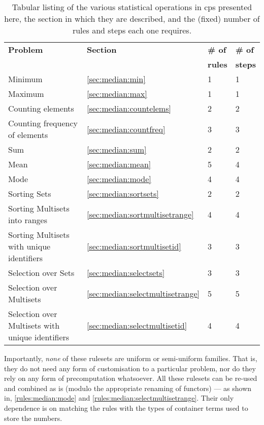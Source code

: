 \begin{table}[htbp] \centering
   \begin{tabular}{|l|l|l|l|}
    \hline
    \textbf{Problem} & \textbf{Section} & \textbf{\# of} & \textbf{\# of}\\&& \textbf{rules} & \textbf{steps}\\ \hline
    Minimum & \ref{sec:median:min} & 1 & 1 \\ %
    Maximum & \ref{sec:median:max} & 1 & 1 \\ \hline
    Counting elements & \ref{sec:median:countelems} & 2 & 2 \\ %
    Counting frequency of elements & \ref{sec:median:countfreq} & 3 & 3 \\ \hline
    Sum & \ref{sec:median:sum} & 2 & 2 \\ %
    Mean & \ref{sec:median:mean} & 5 & 4 \\ %
    Mode & \ref{sec:median:mode} & 4 & 4 \\ \hline
    Sorting Sets & \ref{sec:median:sortsets} & 2 & 2 \\ %
    Sorting Multisets into ranges & \ref{sec:median:sortmultisetrange} & 4 & 4 \\ %
    Sorting Multisets with unique identifiers & \ref{sec:median:sortmultisetid} & 3 & 3 \\ \hline
    Selection over Sets & \ref{sec:median:selectsets} & 3 & 3 \\ %
    Selection over Multisets & \ref{sec:median:selectmultisetrange} & 5 & 5 \\ %
    Selection over Multisets with unique identifiers & \ref{sec:median:selectmultisetid} & 4 & 4 \\ \hline
\end{tabular} 
\caption[Listing of various statistical operations in \gls{cps}]{\label{tab:median:summary}Tabular listing of the various statistical operations in \gls{cps} presented here, the section in which they are described, and the (fixed) number of rules and steps each one requires.}
\end{table}

Importantly, \emph{none} of these \glspl{ruleset} are uniform or semi-uniform families.  That is, they do not need any form of customisation to a particular problem, nor do they rely on any form of precomputation whatsoever.  All these \glspl{ruleset} can be re-used and combined as is (modulo the appropriate renaming of functors) --- as shown in, \eg{} \cref{rules:median:mode} and \cref{rules:median:selectmultisetrange}.  Their only dependence is on matching the rules with the types of container terms used to store the numbers.

